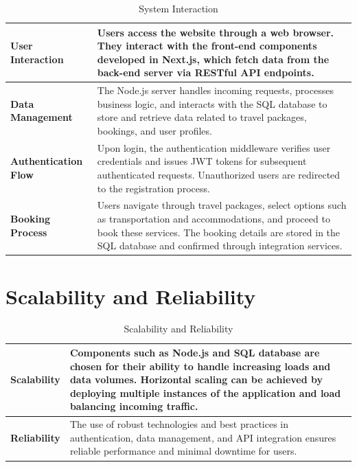 \documentclass{scrreprt}
\begin{document}
    \begin{table}[ht]
    \centering
    \caption{System Interaction}
    \begin{tabular}{|p{4cm}|p{10cm}|}
    \hline
    \textbf{User Interaction} & Users access the website through a web browser. They interact with the front-end components developed in Next.js, which fetch data from the back-end server via RESTful API endpoints. \\
    \hline
    \textbf{Data Management} & The Node.js server handles incoming requests, processes business logic, and interacts with the SQL database to store and retrieve data related to travel packages, bookings, and user profiles. \\
    \hline
    \textbf{Authentication Flow} & Upon login, the authentication middleware verifies user credentials and issues JWT tokens for subsequent authenticated requests. Unauthorized users are redirected to the registration process. \\
    \hline
    \textbf{Booking Process} & Users navigate through travel packages, select options such as transportation and accommodations, and proceed to book these services. The booking details are stored in the SQL database and confirmed through integration services. \\
    \hline
    \end{tabular}
    \end{table}
    
    \vspace{0.5cm}
    
    
    \begin{table}[ht]
    \section{Scalability and Reliability}
    \centering
    \caption{Scalability and Reliability}
    \begin{tabular}{|p{4cm}|p{10cm}|}
    \hline
    \textbf{Scalability} & Components such as Node.js and SQL database are chosen for their ability to handle increasing loads and data volumes. Horizontal scaling can be achieved by deploying multiple instances of the application and load balancing incoming traffic. \\
    \hline
    \textbf{Reliability} & The use of robust technologies and best practices in authentication, data management, and API integration ensures reliable performance and minimal downtime for users. \\
    \hline
    \end{tabular}
    \end{table}
\end{document}

